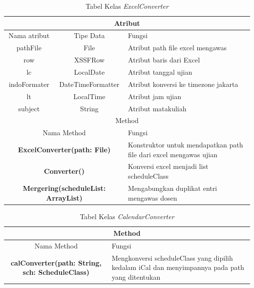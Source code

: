 \begin{table}[H]
	\centering
		\caption{Tabel Kelas \textit{ExcelConverter}}
		\label{tab:excel_converter}
		\begin{tabular}{ | c | c | p{4cm} |}
			\hline
				\multicolumn{3}{|c|}{Atribut} \\ \hline 
				Nama atribut & Tipe Data  & Fungsi \\ \hline
				pathFile & File & Atribut path file excel mengawas\\ \hline
				row & XSSFRow & Atribut baris dari Excel\\ \hline
				lc & LocalDate & Atribut tanggal ujian\\ \hline
				indoFormater & DateTimeFormatter & Atribut konversi ke timezone jakarta\\ \hline
				lt & LocalTime & Atribut jam ujian\\ \hline
				subject & String & Atribut matakuliah\\ \hline
				\multicolumn{3}{|c|}{Method} \\ \hline
				\multicolumn{2}{|c|}{Nama Method} & Fungsi \\ \hline
				\multicolumn{2}{|c|}{\textbf{ExcelConverter(path: File)}} & Konstruktor untuk mendapatkan path file dari excel mengawas ujian\\ \hline
				\multicolumn{2}{|c|}{\textbf{Converter()}} & Konversi excel menjadi list scheduleClass \\ \hline
				\multicolumn{2}{|c|}{\textbf{Mergering(scheduleList: ArrayList)}} & Mengabungkan duplikat entri mengawas dosen \\ \hline
		\end{tabular}
\end{table}

\begin{table}[H]
	\centering
		\caption{Tabel Kelas \textit{CalendarConverter}}
		\label{tab:excel_converter}
		\begin{tabular}{ | c | c | p{4cm} |}
			\hline
				\multicolumn{3}{|c|}{Method}\\ \hline
				\multicolumn{2}{|c|}{Nama Method} & Fungsi \\ \hline
				\multicolumn{2}{|c|}{\textbf{calConverter(path: String, sch: ScheduleClass)}} & Mengkonversi scheduleClass yang dipilih kedalam iCal dan menyimpannya pada path yang ditentukan\\ \hline
		\end{tabular}
\end{table}

